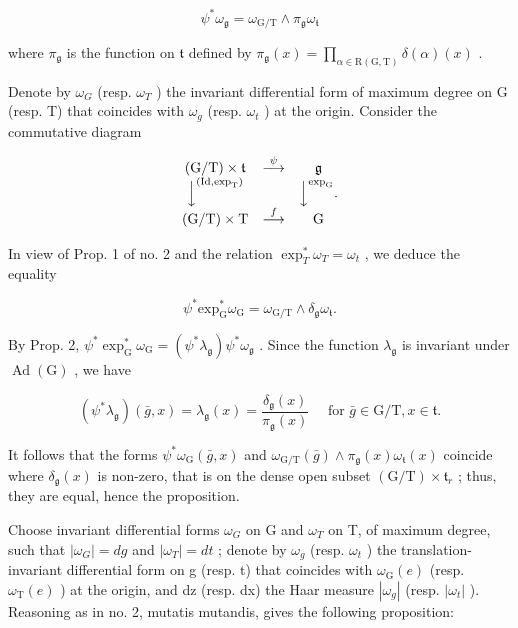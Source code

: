 \[
\psi^ {*} \omega_ {\mathfrak {g}} = \omega_ {\mathrm{G/T}} \wedge \pi_ {\mathfrak {g}} \omega_ {\mathfrak {t}}
\]

where \(\pi_{\mathfrak{g}}\) is the function on \(\mathfrak{t}\) defined by \(\pi_{\mathfrak{g}}(x) = \prod_{\alpha \in \mathrm{R}(\mathrm{G},\mathrm{T})}\delta (\alpha)(x)\) .

Denote by \(\omega_{G}\) (resp. \(\omega_{T}\) ) the invariant differential form of maximum degree on G (resp. T) that coincides with \(\omega_{g}\) (resp. \(\omega_{t}\) ) at the origin. Consider the commutative diagram

\[
\begin{array}{c c c} (\mathrm{G} / \mathrm{T}) \times \mathfrak {t} & \stackrel {{\psi}} {{\longrightarrow}} & \mathfrak {g} \\ \Big \downarrow^ {(\mathrm{Id}, \exp_ {\mathrm{T}})} & & \Big \downarrow^ {\exp_ {\mathrm{G}}} . \\ (\mathrm{G} / \mathrm{T}) \times \mathrm{T} & \stackrel {{f}} {{\longrightarrow}} & \mathrm{G} \end{array}
\]

In view of Prop. 1 of no. 2 and the relation \(\exp_{T}^{*}\omega_{T} = \omega_{t}\) , we deduce the equality

\[
\psi^ {*} \mathrm{exp} _ {\mathrm{G}} ^ {*} \omega_ {\mathrm{G}} = \omega_ {\mathrm{G/T}} \wedge \delta_ {\mathfrak {g}} \omega_ {\mathfrak {t}}.
\]

By Prop. 2, \(\psi^{*}\exp_{\mathrm{G}}^{*}\omega_{\mathrm{G}} = (\psi^{*}\lambda_{\mathfrak{g}})\psi^{*}\omega_{\mathfrak{g}}\) . Since the function \(\lambda_{\mathfrak{g}}\) is invariant under \(\operatorname{Ad}(\mathrm{G})\) , we have

\[
(\psi^ {*} \lambda_ {\mathfrak {g}}) (\bar {g}, x) = \lambda_ {\mathfrak {g}} (x) = \frac {\delta_ {\mathfrak {g}} (x)}{\pi_ {\mathfrak {g}} (x)} \quad \text { for } \bar {g} \in \mathrm{G/T}, x \in \mathfrak {t}.
\]

It follows that the forms \(\psi^{*}\omega_{\mathrm{G}}(\bar{g},x)\) and \(\omega_{\mathrm{G / T}}(\bar{g})\wedge \pi_{\mathfrak{g}}(x)\omega_{\mathfrak{t}}(x)\) coincide where \(\delta_{\mathfrak{g}}(x)\) is non-zero, that is on the dense open subset \((\mathrm{G / T})\times \mathfrak{t}_r\) ; thus, they are equal, hence the proposition.

Choose invariant differential forms \(\omega_{G}\) on G and \(\omega_{T}\) on T, of maximum degree, such that \(|\omega_{G}| = dg\) and \(|\omega_{T}| = dt\) ; denote by \(\omega_{g}\) (resp. \(\omega_{t}\) ) the translation-invariant differential form on g (resp. t) that coincides with \(\omega_{\mathrm{G}}(e)\) (resp. \(\omega_{\mathrm{T}}(e)\) ) at the origin, and dz (resp. dx) the Haar measure \(|\omega_{g}|\) (resp. \(|\omega_{t}|\) ). Reasoning as in no. 2, mutatis mutandis, gives the following proposition:

